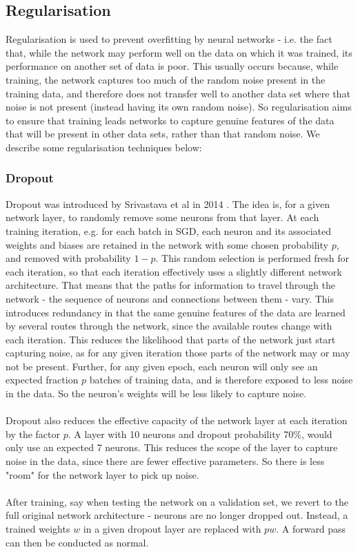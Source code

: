 \documentclass[11pt]{article} %
\theoremstyle{plain}
\theoremstyle{definition}
\begin{document}
\subsection{Regularisation}
Regularisation is used to prevent overfitting by neural networks - i.e. the fact that, while the network may perform well on the data on which it was trained, its performance on another set of data is poor. This usually occurs because, while training, the network captures too much of the random noise present in the training data, and therefore does not transfer well to another data set where that noise is not present (instead having its own random noise). So regularisation aims to ensure that training leads networks to capture genuine features of the data that will be present in other data sets, rather than that random noise. We describe some regularisation techniques below: 

\subsubsection{Dropout}
Dropout was introduced by Srivastava et al in 2014 \cite{dropout_paper}. The idea is, for a given network layer, to randomly remove some neurons from that layer. At each training iteration, e.g. for each batch in SGD, each neuron and its associated weights and biases are retained in the network with some chosen probability \(p\), and removed with probability \(1-p\). This random selection is performed fresh for each iteration, so that each iteration effectively uses a slightly different network architecture. That means that the paths for information to travel through the network - the sequence of neurons and connections between them - vary. This introduces redundancy in that the same genuine features of the data are learned by several routes through the network, since the available routes change with each iteration. This reduces the likelihood that parts of the network just start capturing noise, as for any given iteration those parts of the network may or may not be present. Further, for any given epoch, each neuron will only see an expected fraction \(p\) batches of training data, and is therefore exposed to less noise in the data. So the neuron's weights will be less likely to capture noise.        
\\
\\
\noindent
Dropout also reduces the effective capacity of the network layer at each iteration by the factor \(p\). A layer with 10 neurons and dropout probability 70\%, would only use an expected 7 neurons. This reduces the scope of the layer to capture noise in the data, since there are fewer effective parameters. So there is less "room" for the network layer to pick up noise.
\\
\\
\noindent
After training, say when testing the network on a validation set, we revert to the full original network architecture - neurons are no longer dropped out. Instead, a trained weights \(w\) in a given dropout layer are replaced with \(pw\). A forward pass can then be conducted as normal. 
\end{document}
